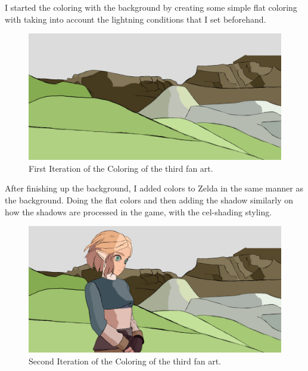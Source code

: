 \documentclass{cup-pan}
\begin{document}
        I started the coloring with the background by creating some simple flat coloring with taking into account the lightning conditions that I set beforehand. 
        \begin{figure}[H]
            \includegraphics[width=\textwidth]{Fanart3/3_Color/I_Color.png}
            \caption{First Iteration of the Coloring of the third fan art.}
        \end{figure}

        After finishing up the background, I added colors to Zelda in the same manner as the background. Doing the flat colors and then adding the shadow similarly on how the shadows are processed in the game, with the cel-shading styling. 
        \begin{figure}[H]
            \includegraphics[width=\textwidth]{Fanart3/3_Color/II_Color.png}
            \caption{Second Iteration of the Coloring of the third fan art.}
        \end{figure}
\end{document}
